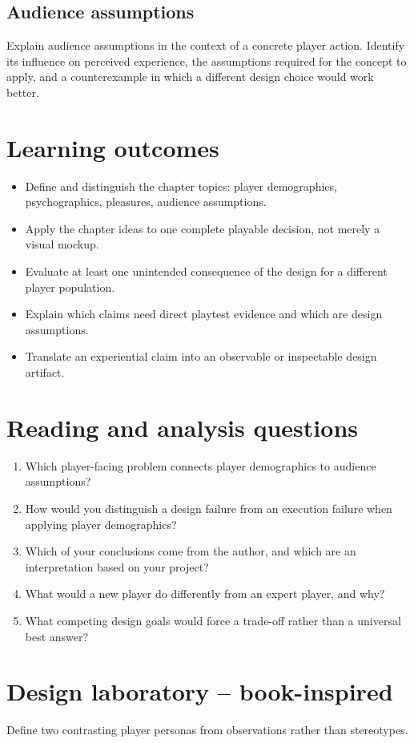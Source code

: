 \documentclass[11pt]{article}
\begin{document}
\subsection{Audience assumptions}
Explain audience assumptions in the context of a concrete player action. Identify its influence on perceived experience, the assumptions required for the concept to apply, and a counterexample in which a different design choice would work better.


\section{Learning outcomes}
\begin{itemize}
\item Define and distinguish the chapter topics: player demographics, psychographics, pleasures, audience assumptions.
\item Apply the chapter ideas to one complete playable decision, not merely a visual mockup.
\item Evaluate at least one unintended consequence of the design for a different player population.
\item Explain which claims need direct playtest evidence and which are design assumptions.
\item Translate an experiential claim into an observable or inspectable design artifact.
\end{itemize}

\section{Reading and analysis questions}
\begin{enumerate}
\item Which player-facing problem connects player demographics to audience assumptions?
\item How would you distinguish a design failure from an execution failure when applying player demographics?
\item Which of your conclusions come from the author, and which are an interpretation based on your project?
\item What would a new player do differently from an expert player, and why?
\item What competing design goals would force a trade-off rather than a universal best answer?
\end{enumerate}

\section{Design laboratory -- book-inspired}
Define two contrasting player personas from observations rather than stereotypes.
\end{document}
